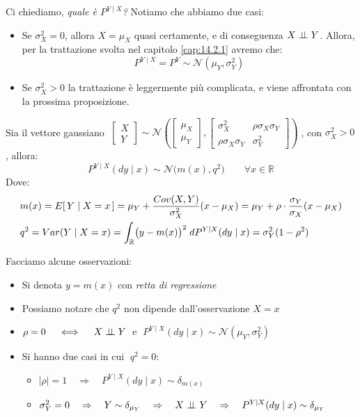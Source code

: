 \noindent Ci chiediamo, \textit{quale è $P^{Y\mid X}$?} Notiamo che abbiamo due casi:
\begin{itemize}
    \item Se $\sigma_X^2 = 0$, allora $X = \mu_X$ quasi certamente, e di conseguenza $X\mathrel{\perp\!\!\!\perp} Y$. Allora, per la trattazione svolta nel capitolo \ref{cap:14.2.1} avremo che:\[P^{Y\mid X} = P^Y\sim \mathcal{N}(\mu_Y, \sigma_Y^2)\]
    \item Se $\sigma_X^2 > 0$ la trattazione è leggermente più complicata, e viene affrontata con la prossima proposizione.
\end{itemize}

\begin{proposizione}
    Sia il vettore gaussiano $\;\begin{bmatrix}X\\Y\end{bmatrix} \sim \mathcal{N}\left(\begin{bmatrix}\mu_X\\\mu_Y\end{bmatrix}, \begin{bmatrix}\sigma_X^2 & \rho\sigma_X\sigma_Y\\ \rho\sigma_X\sigma_Y& \sigma_Y^2\end{bmatrix}\right)\;$, con $\sigma_X^2>0$, allora:
    \[\boxed{P^{Y\mid X}(dy\mid x)\sim\mathcal{N}\bigl(m(x), q^2\bigr)}\qquad \forall x\in\mathbb{R}\]
    Dove:
\begin{align*}
    & m(x) = E\!\left[\,Y\mid X=x\,\right] = \mu_Y + \frac{Cov(X, Y)}{\sigma_X^2}(x-\mu_X) = \mu_Y + \rho \cdot \frac{\sigma_Y}{\sigma_X}(x-\mu_X) \\
    & q^2 = Var(Y\mid X=x) = \int_\mathbb{R}\bigl(y- m(x)\bigr)^2 \;dP^{Y\mid X}(dy\mid x) = \sigma_Y^2(1-\rho^2)
\end{align*}
\end{proposizione}

Facciamo alcune osservazioni:
\begin{itemize}
    \item Si denota $y=m(x)$ con \textit{retta di regressione}
    \item Possiamo notare che $q^2$ non dipende dall'osservazione $X=x$
    \item $\rho = 0\quad \iff \quad X\mathrel{\perp\!\!\!\perp} Y\;$ e $\;P^{Y\mid X}(dy\mid x) \sim \mathcal{N}(\mu_Y, \sigma_Y^2)$
    \item Si hanno due casi in cui $\;q^2=0$:
    \begin{itemize}
        \item $|\rho| = 1 \quad \Rightarrow \quad P^{Y\mid X}(dy\mid x)\sim \delta_{m(x)}$
        \item $\sigma_Y^2 = 0\quad \Rightarrow \quad Y \sim \delta_{\mu_Y} \quad \Rightarrow \quad X\mathrel{\perp\!\!\!\perp} Y \quad \Rightarrow \quad P^{Y\mid X}(dy\mid x)\sim \delta_{\mu_Y}$
    \end{itemize}
\end{itemize}

